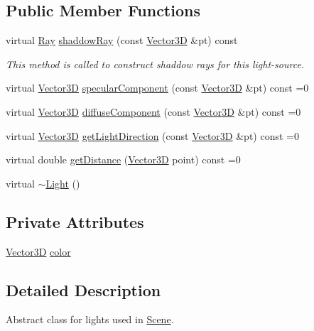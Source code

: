 \subsection*{Public Member Functions}
\begin{DoxyCompactItemize}
\item 
virtual \mbox{\hyperlink{classRay}{Ray}} \mbox{\hyperlink{classLight_aa9c1529bb4a52128590e9b52d8a67517}{shaddow\+Ray}} (const \mbox{\hyperlink{classVector3D}{Vector3D}} \&pt) const
\begin{DoxyCompactList}\small\item\em This method is called to construct shaddow rays for this light-\/source. \end{DoxyCompactList}\item 
virtual \mbox{\hyperlink{classVector3D}{Vector3D}} \mbox{\hyperlink{classLight_a2a4cdf8081c2cab02757c2464610a32f}{specular\+Component}} (const \mbox{\hyperlink{classVector3D}{Vector3D}} \&pt) const =0
\item 
virtual \mbox{\hyperlink{classVector3D}{Vector3D}} \mbox{\hyperlink{classLight_af5dc859ada149ca54ec5088e1c33deb4}{diffuse\+Component}} (const \mbox{\hyperlink{classVector3D}{Vector3D}} \&pt) const =0
\item 
virtual \mbox{\hyperlink{classVector3D}{Vector3D}} \mbox{\hyperlink{classLight_ac075908cf22e9ca9f289c1226d133664}{get\+Light\+Direction}} (const \mbox{\hyperlink{classVector3D}{Vector3D}} \&pt) const =0
\item 
virtual double \mbox{\hyperlink{classLight_a4a7a5a9d4fc67da122c3ce75f6075093}{get\+Distance}} (\mbox{\hyperlink{classVector3D}{Vector3D}} point) const =0
\item 
virtual \mbox{\hyperlink{classLight_abe675054027c4b4a4f3e9a31d330931f}{$\sim$\+Light}} ()
\end{DoxyCompactItemize}
\subsection*{Private Attributes}
\begin{DoxyCompactItemize}
\item 
\mbox{\hyperlink{classVector3D}{Vector3D}} \mbox{\hyperlink{classLight_aea5f05e83e7f64b0a9360a52bcef2250}{color}}
\end{DoxyCompactItemize}


\subsection{Detailed Description}
Abstract class for lights used in \mbox{\hyperlink{classScene}{Scene}}. 

